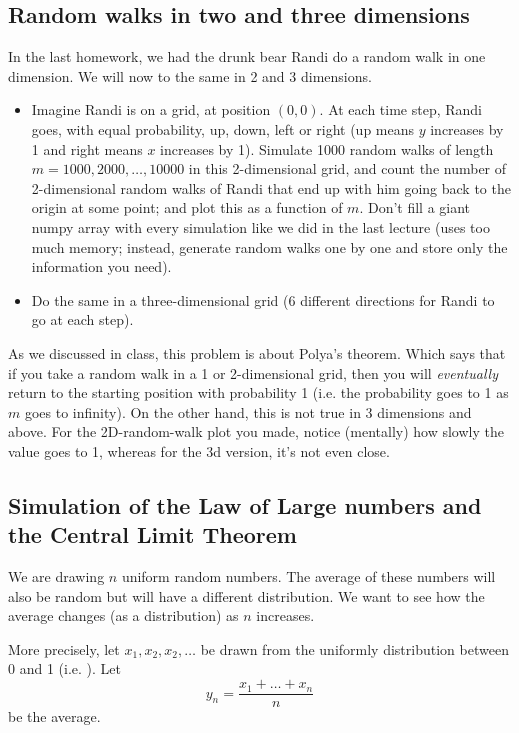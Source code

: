 \documentclass[letterpaper,11pt]{amsart}
\theoremstyle{plain}
\theoremstyle{definition}
\begin{document}
\subsection*{Random walks in two and three dimensions} In the last homework, we had the drunk bear Randi do a random walk in one dimension. We will now to the same in 2 and 3 dimensions. 
\begin{itemize}
  \item Imagine Randi is on a grid, at position $(0,0)$. At each time step, Randi goes, with equal probability, up, down, left or right (up means $y$ increases by 1 and right means $x$ increases by 1). Simulate 1000 random walks of length $m=1000,2000,\dots,10000$ in this 2-dimensional grid, and count the number of 2-dimensional random walks of Randi that end up with him going back to the origin at some point; and plot this as a function of $m$. Don't fill a giant numpy array with every simulation like we did in the last lecture (uses too much memory; instead, generate random walks one by one and store only the information you need).   
  \item Do the same in a three-dimensional grid (6 different directions for Randi to go at each step). 
\end{itemize}

As we discussed in class, this problem is about Polya's theorem. Which says that if you take a random walk in a 1 or 2-dimensional grid, then you will \emph{eventually} return to the starting position with probability 1 (i.e. the probability goes to 1 as $m$ goes to infinity). On the other hand, this is not true in 3 dimensions and above. For the 2D-random-walk plot you made, notice (mentally) how slowly the value goes to 1, whereas for the 3d version, it's not even close. 

\subsection*{Simulation of the Law of Large numbers and the Central Limit Theorem} We are drawing $n$ uniform random numbers. The average of these numbers will also be random but will have a different distribution. We want to see how the average changes (as a distribution) as $n$ increases.  

More precisely, let $x_1,x_2,x_2,\dots$ be drawn from the uniformly distribution between 0 and 1 (i.e. ). Let 
$$y_n = \frac{x_1 + \dots + x_n}{n}$$ be the average. 
\end{document}
